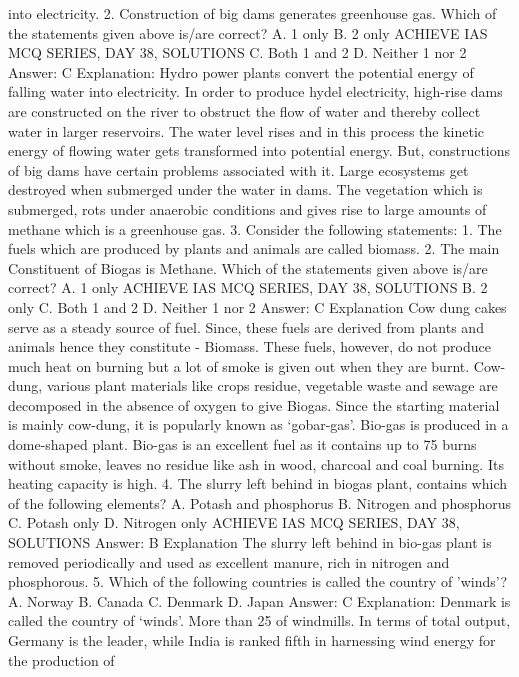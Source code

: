into electricity.
2. Construction of big dams generates greenhouse gas.
Which of the statements given above is/are correct?
A. 1 only
B. 2 only
ACHIEVE IAS MCQ SERIES, DAY 38, SOLUTIONS
C. Both 1 and 2
D. Neither 1 nor 2
Answer: C
Explanation: Hydro power plants convert the potential energy of
falling water into electricity.
In order to produce hydel electricity, high-rise dams are
constructed on the river to obstruct the flow of water and thereby
collect water in larger reservoirs. The water level rises and in this
process the kinetic energy of flowing water gets transformed into
potential energy. But, constructions of big dams have certain
problems associated with it.
Large ecosystems get destroyed when submerged under the water in
dams. The vegetation which is submerged, rots under anaerobic
conditions and gives rise to large amounts of methane which is a
greenhouse gas.
3. Consider the following statements:
1. The fuels which are produced by plants and animals are called
biomass.
2. The main Constituent of Biogas is Methane.
Which of the statements given above is/are correct?
A. 1 only
ACHIEVE IAS MCQ SERIES, DAY 38, SOLUTIONS
B. 2 only
C. Both 1 and 2
D. Neither 1 nor 2
Answer: C
Explanation Cow dung cakes serve as a steady source of fuel. Since,
these fuels are derived from plants and animals hence they
constitute - Biomass. These fuels, however, do not produce much
heat on burning but a lot of smoke is given out when they are burnt.
Cow-dung, various plant materials like crops residue, vegetable waste
and sewage are decomposed in the absence of oxygen to give Biogas.
Since the starting material is mainly cow-dung, it is popularly known
as ‘gobar-gas’. Bio-gas is produced in a dome-shaped plant.
Bio-gas is an excellent fuel as it contains up to 75%
burns without smoke, leaves no residue like ash in wood, charcoal and
coal burning. Its heating capacity is high.
4. The slurry left behind in biogas plant, contains which of the
following elements?
A. Potash and phosphorus
B. Nitrogen and phosphorus
C. Potash only
D. Nitrogen only
ACHIEVE IAS MCQ SERIES, DAY 38, SOLUTIONS
Answer: B
Explanation
The slurry left behind in bio-gas plant is removed periodically and
used as excellent manure, rich in nitrogen and phosphorous.
5. Which of the following countries is called the country of
'winds'?
A. Norway
B. Canada
C. Denmark
D. Japan
Answer: C
Explanation: Denmark is called the country of ‘winds’. More than
25%
of windmills. In terms of total output, Germany is the leader, while
India is ranked fifth in harnessing wind energy for the production of
